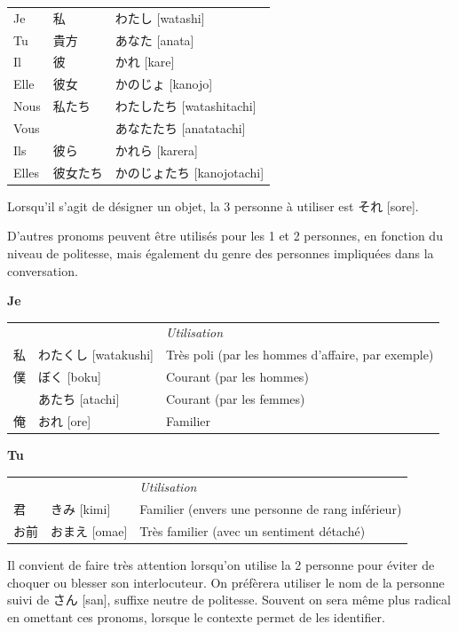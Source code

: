 \documentclass[a4paper,11pt,final]{article}
\newcommand{\sectit}[1]{\bigskip\hspace{-5mm}{\color{sectionblue}$\blacksquare$~~\Large\bfseries #1}}
\newcommand{\romaji}[1]{{\footnotesize[#1]}}
\begin{document}
\hspace{5mm}\begin{tabular}{|p{1.5cm}p{2cm}p{4.5cm}}
	Je			& 私			& わたし \romaji{watashi} \\
	Tu			& 貴方		& あなた \romaji{anata} \\
	Il			& 彼			& かれ \romaji{kare} \\
	Elle		& 彼女		& かのじょ \romaji{kanojo} \\
	Nous		& 私たち		& わたしたち \romaji{watashitachi} \\
	Vous		& 			& あなたたち \romaji{anatatachi} \\
	Ils			& 彼ら		& かれら \romaji{karera} \\
	Elles		& 彼女たち	& かのじょたち \romaji{kanojotachi}
\end{tabular}

Lorsqu'il s'agit de désigner un objet, la 3\ieme{} personne à utiliser est それ \romaji{sore}.


\sectit{Autres pronoms}

D'autres pronoms peuvent être utilisés pour les 1\iere{} et 2\ieme{} personnes, en fonction du niveau de politesse, mais également du genre des personnes impliquées dans la conversation.

\textbf{Je}

\vspace{-7mm}
\hspace{5mm}\begin{tabular}{|p{2cm}p{4.5cm}l}
	\multicolumn{1}{l}{}&& \it\small Utilisation \\
	私			& わたくし \romaji{watakushi}			& Très poli (par les hommes d'affaire, par exemple) \\
	僕			& ぼく \romaji{boku}					& Courant (par les hommes) \\
				& あたち \romaji{atachi}				& Courant (par les femmes) \\
	俺			& おれ \romaji{ore}					& Familier
\end{tabular}

\textbf{Tu}

\vspace{-7mm}
\hspace{5mm}\begin{tabular}{|p{2cm}p{4.5cm}l}
	\multicolumn{1}{l}{}&& \it\small Utilisation \\
	君			& きみ \romaji{kimi}					& Familier (envers une personne de rang inférieur) \\
	お前			& おまえ \romaji{omae}				& Très familier (avec un sentiment détaché)
\end{tabular}

Il convient de faire très attention lorsqu'on utilise la 2\ieme{} personne pour éviter de choquer ou blesser son interlocuteur. On préfèrera utiliser le nom de la personne suivi de さん \romaji{san}, suffixe neutre de politesse. Souvent on sera même plus radical en omettant ces pronoms, lorsque le contexte permet de les identifier.
\end{document}
